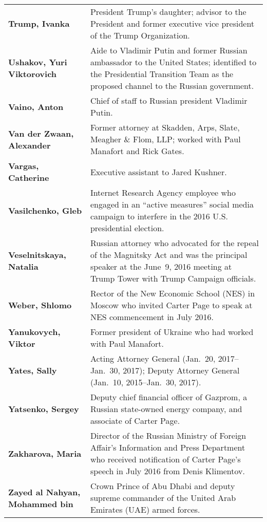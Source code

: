\begin{longtable}{ p{} p{} }
    \textbf{Trump, Ivanka} & President Trump's daughter; advisor to the President and former executive vice president of the Trump Organization. \\

    \textbf{Ushakov, Yuri Viktorovich} & Aide to Vladimir Putin and former Russian ambassador to the United States; identified to the Presidential Transition Team as the proposed channel to the Russian government. \\

    \textbf{Vaino, Anton} & Chief of staff to Russian president Vladimir Putin. \\

    \textbf{Van der Zwaan, Alexander} & Former attorney at Skadden, Arps, Slate, Meagher \& Flom, LLP; worked with Paul Manafort and Rick Gates. \\

    \textbf{Vargas, Catherine} & Executive assistant to Jared Kushner. \\

    \textbf{Vasilchenko, Gleb} & Internet Research Agency employee who engaged in an ``active measures'' social media campaign to interfere in the 2016 U.S. presidential election. \\

    \textbf{Veselnitskaya, Natalia} & Russian attorney who advocated for the repeal of the Magnitsky Act and was the principal speaker at the June~9, 2016 meeting at Trump Tower with Trump Campaign officials. \\

    \textbf{Weber, Shlomo} & Rector of the New Economic School (NES) in Moscow who invited Carter Page to speak at NES commencement in July 2016. \\

    \textbf{Yanukovych, Viktor} & Former president of Ukraine who had worked with Paul Manafort. \\

    \textbf{Yates, Sally} & Acting Attorney General (Jan.~20, 2017--Jan.~30, 2017); Deputy Attorney General (Jan.~10, 2015--Jan.~30, 2017). \\

    \textbf{Yatsenko, Sergey} & Deputy chief financial officer of Gazprom, a Russian state-owned energy company, and associate of Carter Page. \\

    \textbf{Zakharova, Maria} & Director of the Russian Ministry of Foreign Affair's Information and Press Department who received notification of Carter Page's speech in July 2016 from Denis Klimentov. \\

    \textbf{Zayed al Nahyan, Mohammed bin} & Crown Prince of Abu Dhabi and deputy supreme commander of the United Arab Emirates (UAE) armed forces.

\end{longtable}

